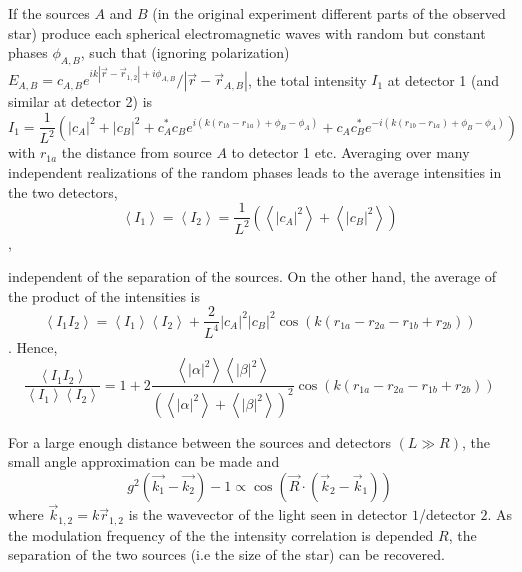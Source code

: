 If the sources $A$ and $B$ (in the original experiment different parts of the observed star) produce each spherical electromagnetic waves with random but constant phases $\phi_{A,B}$, such that (ignoring polarization) $E_{A,B}=c_{A,B} e^{i k\left|\vec{r}-\vec{r}_{1,2}\right|+i \phi_{A,B}} /\left|\vec{r}-\vec{r}_{A,B}\right|$, the total intensity $I_{1}$ at detector 1 (and similar at detector 2) is
\begin{equation}
	I_{1} =
	\frac{1}{L^{2}}\left(
	|c_A|^{2}
	+|c_B|^{2}
	+c_A^{*} c_B     e^{ i\left(k\left(r_{1 b}-r_{1 a}\right)+\phi_{B}-\phi_{A}\right)}
	+c_A     c_B^{*} e^{-i\left(k\left(r_{1 b}-r_{1 a}\right)+\phi_{B}-\phi_{A}\right)}
	\right)
\end{equation}
with $r_{1 a}$ the distance from source $A$ to detector 1 etc. 
Averaging over many independent realizations of the random phases leads to the average intensities in the two detectors,
\begin{equation}
	\left\langle I_{1}\right\rangle=\left\langle I_{2}\right\rangle=\frac{1}{L^{2}}\left(\left\langle|c_A|^{2}\right\rangle+\left\langle|c_B|^{2}\right\rangle\right)
\end{equation}, 

independent of the separation of the sources. On the other hand, the average of the product of the intensities is
\begin{equation}
	\left\langle I_{1} I_{2}\right\rangle =
	\left\langle I_{1}\right\rangle\left\langle I_{2}\right\rangle+\frac{2}{L^{4}}|c_A|^{2}|c_B|^{2} \cos \left(k\left(r_{1 a}-r_{2 a}-r_{1 b}+r_{2 b}\right)\right) 
\end{equation}.
Hence,
\begin{equation}
	\frac{\left\langle I_{1} I_{2}\right\rangle}{\left\langle I_{1}\right\rangle\left\langle I_{2}\right\rangle}
	=1+2 \frac{\left\langle|\alpha|^{2}\right\rangle\left\langle|\beta|^{2}\right\rangle}{\left(\left\langle|\alpha|^{2}\right\rangle+\left\langle|\beta|^{2}\right\rangle\right)^{2}} \cos \left(k\left(r_{1 a}-r_{2 a}-r_{1 b}+r_{2 b}\right)\right)
\end{equation}

For a large enough distance between the sources and detectors $(L \gg R)$, the small angle approximation can be made and
\begin{equation}
	g^2\left(\vec{k_1}-\vec{k_2}\right)-1\propto \cos{\left(\vec{R} \cdot\left(\vec{k}_{2}-\vec{k}_{1}\right)\right)}
\end{equation} 
where $\vec{k}_{1,2}=k \vec{r}_{1,2}$ is the wavevector of the light seen in detector $1$/detector $2$. As the modulation frequency of the the intensity correlation is depended $R$, the separation of the two sources (i.e the size of the star) can be recovered.

